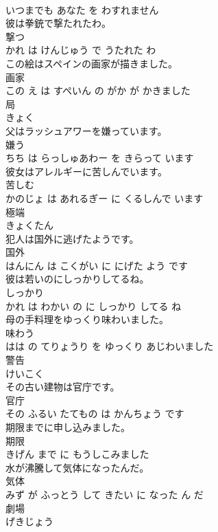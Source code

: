 \documentclass[8pt]{extreport}
\begin{document}
\begin{CJK}{UTF8}{min}
\\	いつまでも あなた を わすれません			
\\	彼は拳銃で撃たれたわ。	
\\	撃つ 
\\	かれ は けんじゅう で うたれた わ			
\\	この絵はスペインの画家が描きました。	
\\	画家 
\\	この え は すぺいん の がか が かきました			
\\	局	
\\	きょく			
\\	父はラッシュアワーを嫌っています。	
\\	嫌う 
\\	ちち は らっしゅあわー を きらって います			
\\	彼女はアレルギーに苦しんでいます。	
\\	苦しむ 
\\	かのじょ は あれるぎー に くるしんで います			
\\	極端	
\\	きょくたん			
\\	犯人は国外に逃げたようです。	
\\	国外 
\\	はんにん は こくがい に にげた よう です			
\\	彼は若いのにしっかりしてるね。	
\\	しっかり 
\\	かれ は わかい の に しっかり してる ね			
\\	母の手料理をゆっくり味わいました。	
\\	味わう 
\\	はは の てりょうり を ゆっくり あじわいました			
\\	警告	
\\	けいこく			
\\	その古い建物は官庁です。	
\\	官庁 
\\	その ふるい たてもの は かんちょう です			
\\	期限までに申し込みました。	
\\	期限 
\\	きげん まで に もうしこみました			
\\	水が沸騰して気体になったんだ。	
\\	気体 
\\	みず が ふっとう して きたい に なった ん だ			
\\	劇場	
\\	げきじょう			

\end{CJK}
\end{document}
